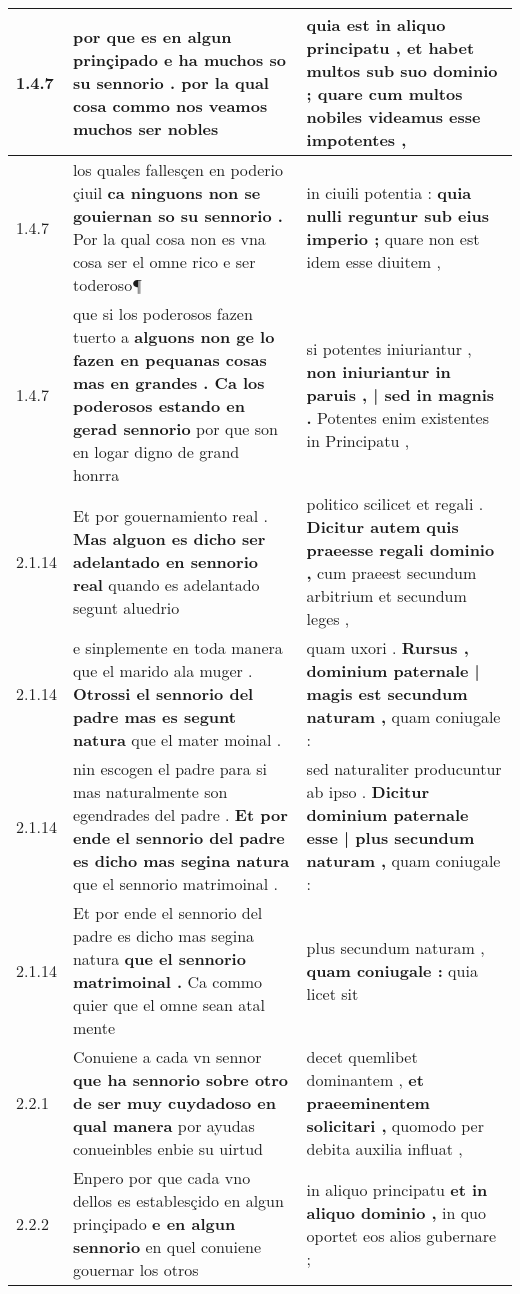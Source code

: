 \begin{tabular}{|p{1cm}|p{6.5cm}|p{6.5cm}|}
1.4.7 & por que es en algun prinçipado \textbf{ e ha muchos so su sennorio . } por la qual cosa commo nos veamos muchos ser nobles & quia est in aliquo principatu , \textbf{ et habet multos sub suo dominio ; } quare cum multos nobiles videamus esse impotentes , \\\hline
1.4.7 & los quales fallesçen en poderio çiuil \textbf{ ca ninguons non se gouiernan so su sennorio . } Por la qual cosa non es vna cosa ser el omne rico e ser toderoso¶ & in ciuili potentia : \textbf{ quia nulli reguntur sub eius imperio ; } quare non est idem esse diuitem , \\\hline
1.4.7 & que si los poderosos fazen tuerto a \textbf{ alguons non ge lo fazen en pequanas cosas mas en grandes . Ca los poderosos estando en gerad sennorio } por que son en logar digno de grand honrra & si potentes iniuriantur , \textbf{ non iniuriantur in paruis , | sed in magnis . } Potentes enim existentes in Principatu , \\\hline
2.1.14 & Et por gouernamiento real . \textbf{ Mas alguon es dicho ser adelantado en sennorio real } quando es adelantado segunt aluedrio & politico scilicet et regali . \textbf{ Dicitur autem quis praeesse regali dominio , } cum praeest secundum arbitrium et secundum leges , \\\hline
2.1.14 & e sinplemente en toda manera que el marido ala muger . \textbf{ Otrossi el sennorio del padre mas es segunt natura } que el mater moinal . & quam uxori . \textbf{ Rursus , dominium paternale | magis est secundum naturam , } quam coniugale : \\\hline
2.1.14 & nin escogen el padre para si mas naturalmente son egendrades del padre . \textbf{ Et por ende el sennorio del padre es dicho mas segina natura } que el sennorio matrimoinal . & sed naturaliter producuntur ab ipso . \textbf{ Dicitur dominium paternale esse | plus secundum naturam , } quam coniugale : \\\hline
2.1.14 & Et por ende el sennorio del padre es dicho mas segina natura \textbf{ que el sennorio matrimoinal . } Ca commo quier que el omne sean atal mente & plus secundum naturam , \textbf{ quam coniugale : } quia licet sit \\\hline
2.2.1 & Conuiene a cada vn sennor \textbf{ que ha sennorio sobre otro de ser muy cuydadoso en qual manera } por ayudas conueinbles enbie su uirtud & decet quemlibet dominantem , \textbf{ et praeeminentem solicitari , } quomodo per debita auxilia influat , \\\hline
2.2.2 & Enpero por que cada vno dellos es establesçido en algun prinçipado \textbf{ e en algun sennorio } en quel conuiene gouernar los otros & in aliquo principatu \textbf{ et in aliquo dominio , } in quo oportet eos alios gubernare ; \\\hline

\end{tabular}
